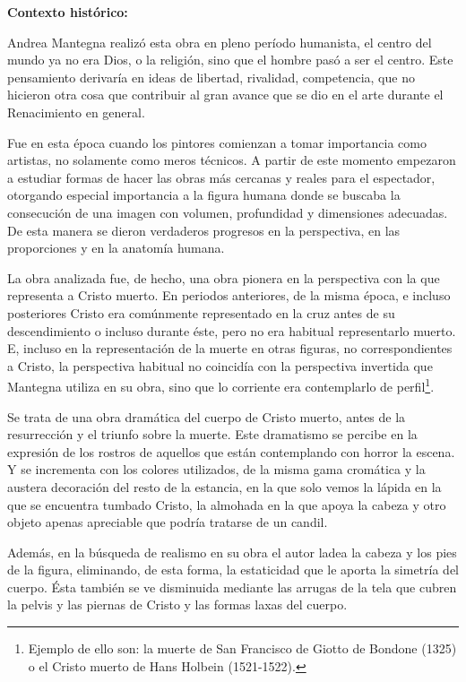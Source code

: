\textbf{Contexto histórico:}

Andrea Mantegna realizó esta obra en pleno período humanista, el centro del mundo ya no era Dios, o la religión, sino que el hombre pasó a ser el centro. Este pensamiento derivaría en ideas de libertad, rivalidad, competencia, que no hicieron otra cosa que contribuir al gran avance que se dio en el arte durante el Renacimiento en general.

Fue en esta época cuando los pintores comienzan a tomar importancia como artistas, no solamente como meros técnicos. A partir de este momento empezaron a estudiar formas de hacer las obras más cercanas y reales para el espectador, otorgando especial importancia a la figura humana donde se buscaba la consecución de una imagen con volumen, profundidad y dimensiones adecuadas. De esta manera se dieron verdaderos progresos en la perspectiva, en las proporciones y en la anatomía humana.

La obra analizada fue, de hecho, una obra pionera en la perspectiva con la que representa a Cristo muerto. En periodos anteriores, de la misma época, e incluso posteriores Cristo era comúnmente representado en la cruz antes de su descendimiento o incluso durante éste, pero no era habitual representarlo muerto. E, incluso en la representación de la muerte en otras figuras, no correspondientes a Cristo, la perspectiva habitual no coincidía con la perspectiva invertida que Mantegna utiliza en su obra, sino que lo corriente era contemplarlo de perfil\footnote{Ejemplo de ello son: la muerte de San Francisco de Giotto de Bondone (1325) o el Cristo muerto de Hans Holbein (1521-1522).}.

Se trata de una obra dramática del cuerpo de Cristo muerto, antes de la resurrección y el triunfo sobre la muerte. Este dramatismo se percibe en la expresión de los rostros de aquellos que están contemplando con horror la escena. Y se incrementa con los colores utilizados, de la misma gama cromática y la austera decoración del resto de la estancia, en la que solo vemos la lápida en la que se encuentra tumbado Cristo, la almohada en la que apoya la cabeza y otro objeto apenas apreciable que podría tratarse de un candil.

Además, en la búsqueda de realismo en su obra el autor ladea la cabeza y los pies de la figura, eliminando, de esta forma, la estaticidad que le aporta la simetría del cuerpo. Ésta también se ve disminuida mediante las arrugas de la tela que cubren la pelvis y las piernas de Cristo y las formas laxas del cuerpo.

